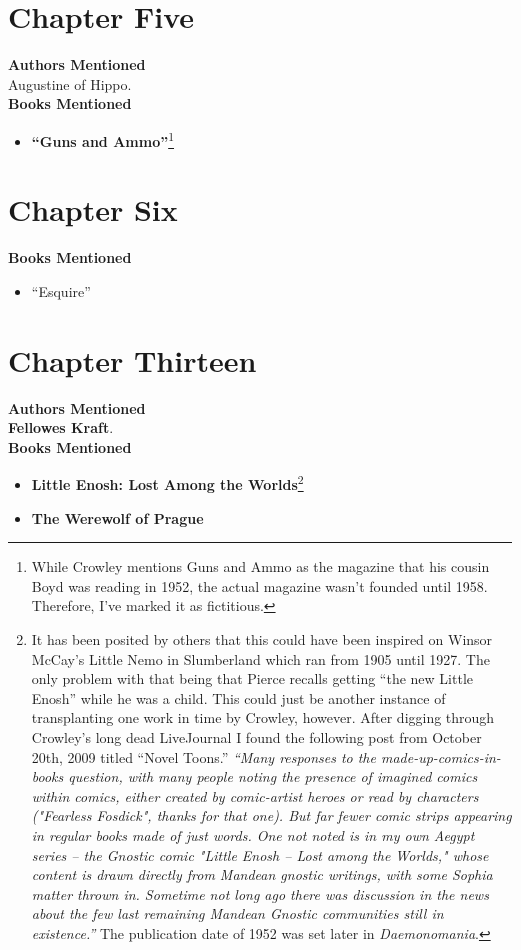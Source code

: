 \documentclass[12pt,makeidx]{extreport}
\begin{document}
\section{Chapter Five}
\textbf{Authors Mentioned}\\
Augustine of Hippo.
\\

\hspace{-1.5em}\textbf{Books Mentioned}
\begin{itemize}
\item \textbf{“Guns and Ammo”}\footnote{While Crowley mentions Guns and Ammo as the magazine that his cousin Boyd was reading in 1952, the actual magazine wasn’t founded until 1958. Therefore, I’ve marked it as fictitious.} \parencite{gunsnammo}
\end{itemize}

\section{Chapter Six}
\textbf{Books Mentioned}
\begin{itemize}
\item “Esquire” \parencite{esquire}
\end{itemize}

\section{Chapter Thirteen}
\textbf{Authors Mentioned}\\
\textbf{Fellowes Kraft}.
\\

\hspace{-1.5em}\textbf{Books Mentioned}
\begin{itemize}
\item \textbf{Little Enosh: Lost Among the Worlds}\footnote{It has been posited by others that this could have been inspired on Winsor McCay’s Little Nemo in Slumberland which ran from 1905 until 1927. The only problem with that being that Pierce recalls getting “the new Little Enosh” while he was a child. This could just be another instance of transplanting one work in time by Crowley, however. After digging through Crowley's long dead LiveJournal I found the following post from October 20th, 2009 titled ``Novel Toons.'' \textit{``Many responses to the made-up-comics-in-books question, with many people noting the presence of imagined comics within comics, either created by comic-artist heroes or read by characters ("Fearless Fosdick", thanks for that one).  But far fewer comic strips appearing in regular books made of just words.  One not noted is in my own Aegypt series -- the Gnostic comic "Little Enosh -- Lost among the Worlds," whose content is drawn directly from Mandean gnostic writings, with some Sophia matter thrown in.  Sometime not long ago there was discussion in the news about the few last remaining Mandean Gnostic communities still in existence.''} The publication date of 1952 was set later in \textit{Daemonomania}.\label{enosh}} \parencite{enosh}
\item \textbf{The Werewolf of Prague} \parencite{CraftW1}
\end{itemize}
\end{document}
